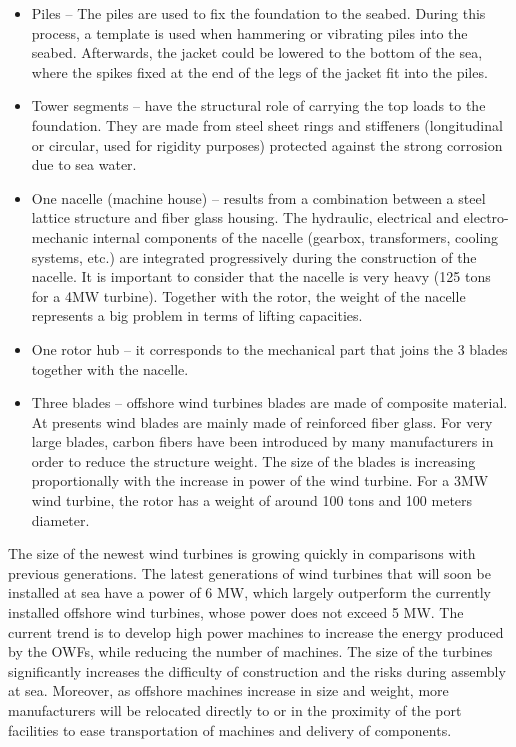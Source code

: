 \begin{itemize}
\item Piles -- The piles are used to fix the foundation to the seabed. During this process, a template is used when hammering or vibrating piles into the seabed. Afterwards, the jacket could be lowered to the bottom of the sea, where the spikes fixed at the end of the legs of the jacket fit into the piles.
\item Tower segments -- have the structural role of carrying the top loads to the foundation. They are made from steel sheet rings and stiffeners (longitudinal or circular, used for rigidity purposes) protected against the strong corrosion due to sea water.
\item One nacelle (machine house) -- results from a combination between a steel lattice structure and fiber glass housing. The hydraulic, electrical and electro-mechanic internal components of the nacelle (gearbox, transformers, cooling systems, etc.) are integrated progressively during the construction of the nacelle. It is important to consider that the nacelle is very heavy (125 tons for a 4MW turbine). Together with the rotor, the weight of the nacelle represents a big problem in terms of lifting capacities.
\item One rotor hub -- it corresponds to the mechanical part that joins the 3 blades together with the nacelle.
\item Three blades -- offshore wind turbines blades are made of composite material. At presents wind blades are mainly made of reinforced fiber glass. For very large blades, carbon fibers have been introduced by many manufacturers in order to reduce the structure weight. The size of the blades is increasing proportionally with the increase in power of the wind turbine. For a 3MW wind turbine, the rotor has a weight of around 100 tons and 100 meters diameter.
\end{itemize}


The size of the newest wind turbines is growing quickly in comparisons with previous generations. The latest generations of wind turbines that will soon be installed at sea have a power of 6 MW, which largely outperform the currently installed offshore wind turbines, whose power does not exceed 5 MW. The current trend is to develop high power machines to increase the energy produced by the OWFs, while reducing the number of machines. The size of the turbines significantly increases the difficulty of construction and the risks during assembly at sea. Moreover, as offshore machines increase in size and weight, more manufacturers will be relocated directly to or in the proximity of the port facilities to ease transportation of machines and delivery of components.

